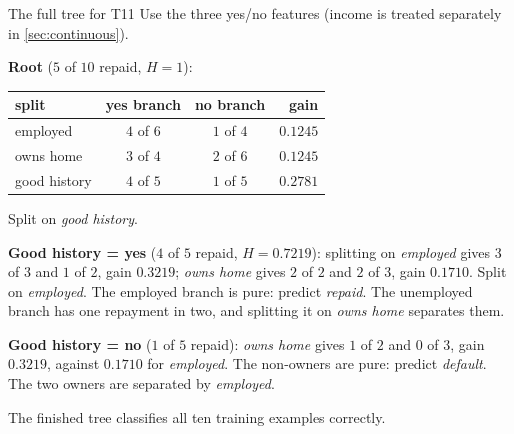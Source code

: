 \begin{workedexample}{The full tree for T11}
Use the three yes/no features (income is treated separately in
\cref{sec:continuous}).

\textbf{Root} ($5$ of $10$ repaid, $H = 1$):

\begin{center}
\small
\renewcommand{\arraystretch}{1.15}
\begin{tabular}{@{}lccr@{}}
\toprule
split & yes branch & no branch & gain\\
\midrule
employed      & $4$ of $6$ & $1$ of $4$ & $0.1245$\\
owns home     & $3$ of $4$ & $2$ of $6$ & $0.1245$\\
good history  & $4$ of $5$ & $1$ of $5$ & $\mathbf{0.2781}$\\
\bottomrule
\end{tabular}
\end{center}

Split on \emph{good history}.

\textbf{Good history = yes} ($4$ of $5$ repaid, $H = 0.7219$): splitting on
\emph{employed} gives $3$ of $3$ and $1$ of $2$, gain $0.3219$; \emph{owns home}
gives $2$ of $2$ and $2$ of $3$, gain $0.1710$. Split on \emph{employed}. The
employed branch is pure: predict \emph{repaid}. The unemployed branch has one
repayment in two, and splitting it on \emph{owns home} separates them.

\textbf{Good history = no} ($1$ of $5$ repaid): \emph{owns home} gives $1$ of $2$
and $0$ of $3$, gain $0.3219$, against $0.1710$ for \emph{employed}. The
non-owners are pure: predict \emph{default}. The two owners are separated by
\emph{employed}.

The finished tree classifies all ten training examples correctly.
\end{workedexample}

